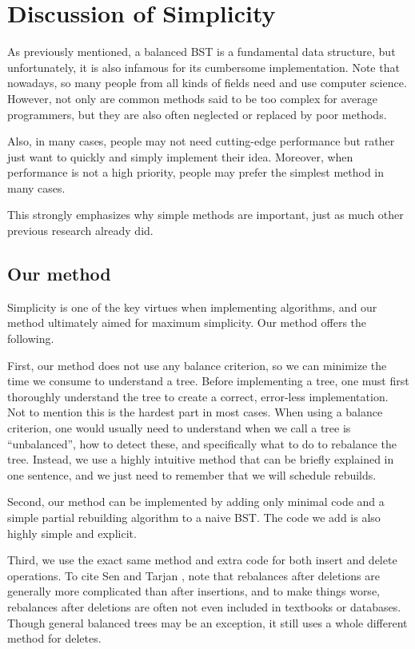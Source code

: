\documentclass{article}
\begin{document}
\section {Discussion of Simplicity}
\label{sec:discussions}
As previously mentioned, a balanced BST is a fundamental data structure, but unfortunately, it is also infamous for its cumbersome implementation. Note that nowadays, so many people from all kinds of fields need and use computer science. However, not only are common methods said to be too complex for average programmers, but they are also often neglected or replaced by poor methods.

Also, in many cases, people may not need cutting-edge performance but rather just want to quickly and simply implement their idea. Moreover, when performance is not a high priority, people may prefer the simplest method in many cases.

This strongly emphasizes why simple methods are important, just as much other previous research already did.

\subsection*{Our method}
Simplicity is one of the key virtues when implementing algorithms, and our method ultimately aimed for maximum simplicity. Our method offers the following.

First, our method does not use any balance criterion, so we can minimize the time we consume to understand a tree. Before implementing a tree, one must first thoroughly understand the tree to create a correct, error-less implementation. Not to mention this is the hardest part in most cases. When using a balance criterion, one would usually need to understand when we call a tree is ``unbalanced'', how to detect these, and specifically what to do to rebalance the tree. Instead, we use a highly intuitive method that can be briefly explained in one sentence, and we just need to remember that we will schedule rebuilds.

Second, our method can be implemented by adding only minimal code and a simple partial rebuilding algorithm to a naive BST. The code we add is also highly simple and explicit.

Third, we use the exact same method and extra code for both insert and delete operations. To cite Sen and Tarjan \cite{SenNoDel}, note that rebalances after deletions are generally more complicated than after insertions, and to make things worse, rebalances after deletions are often not even included in textbooks or databases. Though general balanced trees may be an exception, it still uses a whole different method for deletes.
\end{document}
